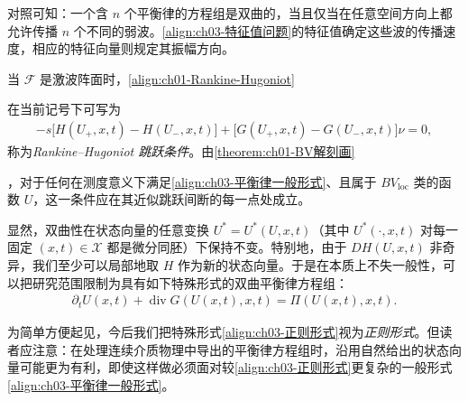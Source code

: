 \documentclass[../../main.tex]{subfiles}
\begin{document}
对照可知：一个含 $n$ 个平衡律的方程组是双曲的，当且仅当在任意空间方向上都允许传播 $n$ 个不同的弱波。\eqref{align:ch03-特征值问题}的特征值确定这些波的传播速度，相应的特征向量则规定其振幅方向。

当 $\mathscr{F}$ 是激波阵面时，\eqref{align:ch01-Rankine-Hugoniot}%

在当前记号下可写为
\begin{align}
-s\big[H(U_{+},x,t)-H(U_{-},x,t)\big]+\big[G(U_{+},x,t)-G(U_{-},x,t)\big]\nu=0,
\label{align:ch03-RH一般形式}
\end{align}
称为\emph{Rankine--Hugoniot 跳跃条件}。由\cref{theorem:ch01-BV解刻画}%

，对于任何在测度意义下满足\eqref{align:ch03-平衡律一般形式}、且属于 $BV_{\mathrm{loc}}$ 类的函数 $U$，这一条件应在其近似跳跃间断的每一点处成立。

显然，双曲性在状态向量的任意变换 $U^{*}=U^{*}(U,x,t)$（其中 $U^{*}(\cdot,x,t)$ 对每一固定 $(x,t)\in\mathscr{X}$ 都是微分同胚）下保持不变。特别地，由于 $DH(U,x,t)$ 非奇异，我们至少可以局部地取 $H$ 作为新的状态向量。于是在本质上不失一般性，可以把研究范围限制为具有如下特殊形式的双曲平衡律方程组：
\begin{align}
\partial_{t}U(x,t)+\operatorname{div}G(U(x,t),x,t)=\Pi(U(x,t),x,t).
\label{align:ch03-正则形式}
\end{align}

为简单方便起见，今后我们把特殊形式\eqref{align:ch03-正则形式}视为\emph{正则形式}。但读者应注意：在处理连续介质物理中导出的平衡律方程组时，沿用自然给出的状态向量可能更为有利，即使这样做必须面对较\eqref{align:ch03-正则形式}更复杂的一般形式\eqref{align:ch03-平衡律一般形式}。
\end{document}
